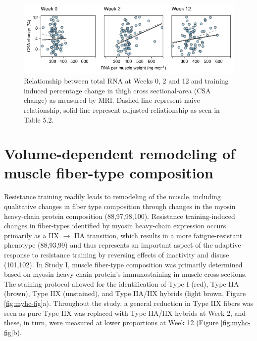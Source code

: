 \documentclass[twoside,10pt]{gihclass} %
\begin{document}
\begin{figure}

{\centering \includegraphics{thesis_files/figure-latex/rrna-csa-fig-1} 

}

\caption[Relationship between total RNA and training induced muscle growth]{Relationship between total RNA at Weeks 0, 2 and 12 and training induced percentage change in thigh cross sectional-area (CSA change) as measured by MRI. Dashed line represent naive relationship, solid line represent adjusted reliationship as seen in Table 5.2.}\label{fig:rrna-csa-fig}
\end{figure}
\hypertarget{volume-dependent-remodeling-of-muscle-fiber-type-composition}{%
\section{Volume-dependent remodeling of muscle fiber-type composition}\label{volume-dependent-remodeling-of-muscle-fiber-type-composition}}

Resistance training readily leads to remodeling of the muscle, including qualitative changes in fiber type composition through changes in the myosin heavy-chain protein composition
(88,97,98,100).
Resistance training-induced changes in fiber-types identified by myosin heavy-chain expression occurs primarily as a IIX \(\rightarrow\) IIA transition, which results in a more fatigue-resistant phenotype
(88,93,99)
and thus represents an important aspect of the adaptive response to resistance training by reversing effects of inactivity and disuse
(101,102).
In Study I, muscle fiber-type composition was primarily determined based on myosin heavy-chain protein's immunostaining in muscle cross-sections. The staining protocol allowed for the identification of Type I (red), Type IIA (brown), Type IIX (unstained), and Type IIA/IIX hybrids (light brown, Figure \ref{fig:myhc-fig}a). Throughout the study, a general reduction in Type IIX fibers was seen as pure Type IIX was replaced with Type IIA/IIX hybrids at Week 2, and these, in turn, were measured at lower proportions at Week 12 (Figure \ref{fig:myhc-fig}b).
\end{document}
